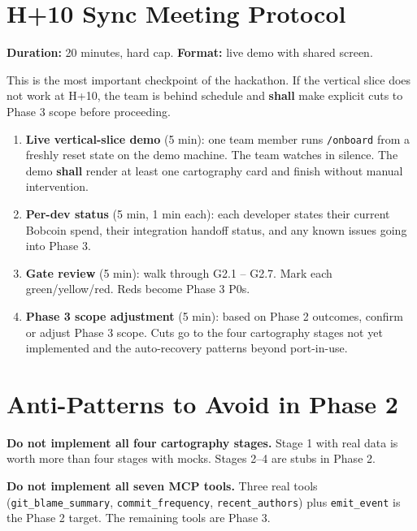 \documentclass[11pt,letterpaper]{article}
\newcommand{\shall}{\textbf{shall}}
\begin{document}
\section{H+10 Sync Meeting Protocol}

\textbf{Duration:} 20 minutes, hard cap. \textbf{Format:} live demo with shared screen.

This is the most important checkpoint of the hackathon. If the vertical slice does not work at H+10, the team is behind schedule and \shall{} make explicit cuts to Phase 3 scope before proceeding.

\begin{enumerate}
  \item \textbf{Live vertical-slice demo} (5 min): one team member runs \texttt{/onboard} from a freshly reset state on the demo machine. The team watches in silence. The demo \shall{} render at least one cartography card and finish without manual intervention.
  \item \textbf{Per-dev status} (5 min, 1 min each): each developer states their current Bobcoin spend, their integration handoff status, and any known issues going into Phase 3.
  \item \textbf{Gate review} (5 min): walk through G2.1 -- G2.7. Mark each green/yellow/red. Reds become Phase 3 P0s.
  \item \textbf{Phase 3 scope adjustment} (5 min): based on Phase 2 outcomes, confirm or adjust Phase 3 scope. Cuts go to the four cartography stages not yet implemented and the auto-recovery patterns beyond port-in-use.
\end{enumerate}

\section{Anti-Patterns to Avoid in Phase 2}

\begin{warning}
\textbf{Do not implement all four cartography stages.} Stage 1 with real data is worth more than four stages with mocks. Stages 2--4 are stubs in Phase 2.
\end{warning}

\begin{warning}
\textbf{Do not implement all seven MCP tools.} Three real tools (\texttt{git\_blame\_summary}, \texttt{commit\_frequency}, \texttt{recent\_authors}) plus \texttt{emit\_event} is the Phase 2 target. The remaining tools are Phase 3.
\end{warning}
\end{document}
